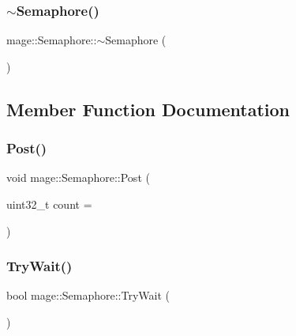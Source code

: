 \hypertarget{classmage_1_1_semaphore_a991ed365c28e4a9c63ff34a5efeb012d}{}\label{classmage_1_1_semaphore_a991ed365c28e4a9c63ff34a5efeb012d} 
\subsubsection{\texorpdfstring{$\sim$\+Semaphore()}{~Semaphore()}}
{\footnotesize\ttfamily mage\+::\+Semaphore\+::$\sim$\+Semaphore (\begin{DoxyParamCaption}{ }\end{DoxyParamCaption})}



\subsection{Member Function Documentation}
\hypertarget{classmage_1_1_semaphore_a354ea9743f9794b14a3f032e0443b214}{}\label{classmage_1_1_semaphore_a354ea9743f9794b14a3f032e0443b214} 
\subsubsection{\texorpdfstring{Post()}{Post()}}
{\footnotesize\ttfamily void mage\+::\+Semaphore\+::\+Post (\begin{DoxyParamCaption}\item[{uint32\+\_\+t}]{count = {} }\end{DoxyParamCaption})}

\hypertarget{classmage_1_1_semaphore_ab34cdf4e9b7388dbdb30aab167c074f6}{}\label{classmage_1_1_semaphore_ab34cdf4e9b7388dbdb30aab167c074f6} 
\subsubsection{\texorpdfstring{Try\+Wait()}{TryWait()}}
{\footnotesize\ttfamily bool mage\+::\+Semaphore\+::\+Try\+Wait (\begin{DoxyParamCaption}{ }\end{DoxyParamCaption})}

\hypertarget{classmage_1_1_semaphore_ae63599939b6bcc3939cbeddd7ffa5f66}{}\label{classmage_1_1_semaphore_ae63599939b6bcc3939cbeddd7ffa5f66} 
